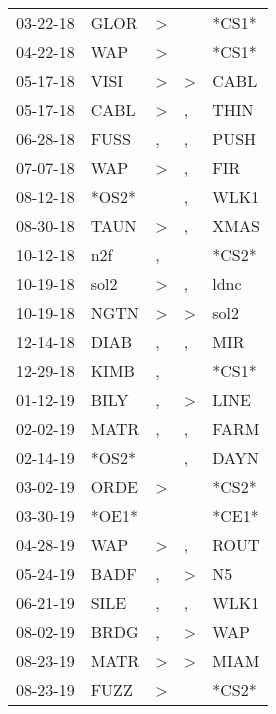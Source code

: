 \begin{supertabular}{lllll}
 03-22-18 &   GLOR &     \textgreater &                  &  *CS1* \\
 04-22-18 &    WAP &     \textgreater &                  &  *CS1* \\
 05-17-18 &   VISI &     \textgreater &     \textgreater &   CABL \\
 05-17-18 &   CABL &     \textgreater &                , &   THIN \\
 06-28-18 &   FUSS &                , &                , &   PUSH \\
 07-07-18 &    WAP &     \textgreater &                , &    FIR \\
 08-12-18 &  *OS2* &                  &                , &   WLK1 \\
 08-30-18 &   TAUN &     \textgreater &                , &   XMAS \\
 10-12-18 &    n2f &                , &                  &  *CS2* \\
 10-19-18 &   sol2 &     \textgreater &                , &   ldnc \\
 10-19-18 &   NGTN &     \textgreater &     \textgreater &   sol2 \\
 12-14-18 &   DIAB &                , &                , &    MIR \\
 12-29-18 &   KIMB &                , &                  &  *CS1* \\
 01-12-19 &   BILY &                , &     \textgreater &   LINE \\
 02-02-19 &   MATR &                , &                , &   FARM \\
 02-14-19 &  *OS2* &                  &                , &   DAYN \\
 03-02-19 &   ORDE &     \textgreater &                  &  *CS2* \\
 03-30-19 &  *OE1* &                  &                  &  *CE1* \\
 04-28-19 &    WAP &     \textgreater &                , &   ROUT \\
 05-24-19 &   BADF &                , &     \textgreater &     N5 \\
 06-21-19 &   SILE &                , &                , &   WLK1 \\
 08-02-19 &   BRDG &                , &     \textgreater &    WAP \\
 08-23-19 &   MATR &     \textgreater &     \textgreater &   MIAM \\
 08-23-19 &   FUZZ &     \textgreater &                  &  *CS2* \\

\end{supertabular}
